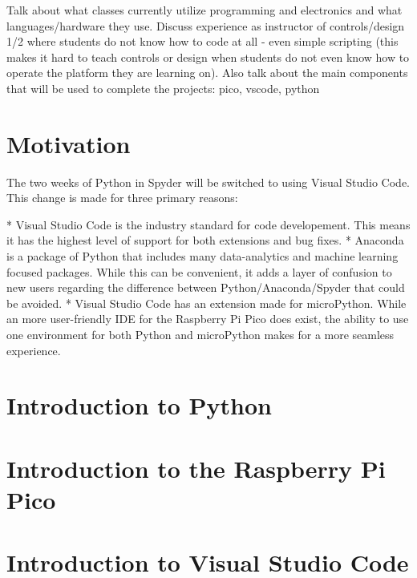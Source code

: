 Talk about what classes currently utilize programming and electronics 
and what languages/hardware they use. Discuss experience as instructor 
of controls/design 1/2 where students do not know how to code at 
all - even simple scripting (this makes it hard to teach controls or 
design when students do not even know how to operate the platform they
are learning on). Also talk about the main components that will be 
used to complete the projects: pico, vscode, python

\section{Motivation}

The two weeks of Python in Spyder will be switched to using Visual Studio Code. This change is made for three primary reasons:

* Visual Studio Code is the industry standard for code developement. This means it has the highest level of support for both extensions and bug fixes.
* Anaconda is a package of Python that includes many data-analytics and machine learning focused packages. While this can be convenient, it adds a layer of confusion to new users regarding the difference between Python/Anaconda/Spyder that could be avoided.
* Visual Studio Code has an extension made for microPython. While an more user-friendly IDE for the Raspberry Pi Pico does exist, the ability to use one environment for both Python and microPython makes for a more seamless experience.

\section{Introduction to Python}

\section{Introduction to the Raspberry Pi Pico}

\section{Introduction to Visual Studio Code}